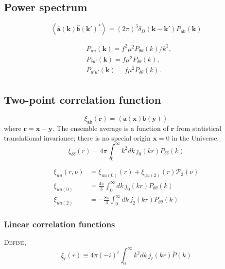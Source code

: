 \documentclass[a4paper,11pt, fleqn]{article}
\begin{document}
\clearpage
\subsection{Power spectrum}
\begin{equation}
  \left\langle \hat{\mathtt{a}}(\bm{k}) \hat{\mathtt{b}}(\bm{k}')^* \right\rangle
  = (2\pi)^3 \delta_D(\bm{k}-\bm{k}') P_{\mathtt{ab}}(\bm{k})
\end{equation}

\begin{align}
  &P_{uu}(\bm{k}) = f^2\mu^2 P_{\theta\theta}(k)/k^2,\\
  &P_{\delta u'}(\bm{k}) = f \mu^2 P_{\delta \theta}(k),\\
  &P_{u' u'}(\bm{k}) = f \mu^2 P_{\delta \theta}(k).\\
\end{align}


\clearpage
\subsection{Two-point correlation function}

\begin{equation}
  \xi_{\mathtt{ab}}(\bm{r}) = \left\langle \mathtt{a}(\bm{x}) \mathtt{b}(\bm{y})
                             \right\rangle
\end{equation}
%
where $\bm{r} = \bm{x} - \bm{y}$. The ensemble average is a function
of $\bm{r}$ from statistical translational invariance; there is no
special origin $\bm{x} = 0$ in the Universe.\\

\begin{equation}
  \xi_{\delta\delta}(r) = 4\pi \int_0^\infty \! k^2 dk\,
  j_0(kr) P_{\delta\delta}(k)
\end{equation}

\begin{align}
  \xi_{uu}(r, \nu) &= \xi_{uu(0)}(r) + \xi_{uu(2)}(r) \mathcal{P}_2(\nu)\\
  \xi_{uu(0)} &= \frac{4\pi}{3} \int_0^\infty \!dk\,
                   j_0(kr) P_{\theta\theta}(k)\\
  \xi_{uu(2)} &= -\frac{8\pi}{3} \int_0^\infty \! dk\,
                   j_2(kr) P_{\theta\theta}(k)
\end{align}

\clearpage
\subsubsection{Linear correlation functions}
\textsc{Define},
%
\begin{equation}
  \xi_{\ell}(r)
  \equiv 4\pi (-i)^\ell \int_0^\infty \! k^2 dk \, j_\ell(kr) \bar{P}(k)
\end{equation}
\end{document}
